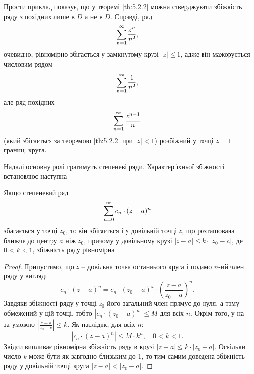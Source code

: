 \begin{remark*}
	Прости приклад показує, що у теоремі \ref{th:5.2.2} можна стверджувати збіжність ряду з похідних лише в $D$ а не в $\bar D$. Справді, ряд 
	\begin{equation*}
		\displaystyle\sum\limits_{n = 1}^\infty \frac{z^n}{n^2},
	\end{equation*}
	очевидно, рівномірно збігається у замкнутому крузі $|z| \le 1$, адже він мажорується числовим рядом
	\begin{equation*}
		\displaystyle\sum\limits_{n = 1}^\infty \frac{1}{n^2},
	\end{equation*}
	але ряд похідних
	\begin{equation*}
		\displaystyle\sum\limits_{n = 1}^\infty \frac{z^{n - 1}}{n}
	\end{equation*}
	(який збігається за теоремою \ref{th:5.2.2} при $|z| < 1$) розбіжний у точці $z = 1$ границі круга.
\end{remark*}

Надалі основну ролі гратимуть степеневі ряди. Характер їхньої збіжності встановлює наступна
\begin{theorem}[Н. Абель, 1826 р.]
	Якщо степеневий ряд 
	\begin{equation}
		\label{eq:5.2._10}
		\displaystyle\sum\limits_{n = 0}^\infty c_n \cdot (z - a)^n
	\end{equation}
	збагається у точці $z_0$, то він збігається і у довільній точці $z$, що розташована ближче до центру $a$ ніж $z_0$, причому у довільному крузі $|z - a| \le k \cdot |z_0 - a|$, де $0 < k < 1$, збіжність ряду рівномірна
\end{theorem}

\begin{proof}
	Припустимо, що $z$ -- довільна точка останнього круга і подамо $n$-ий член ряду у вигляді 
	\begin{equation*}
		c_n \cdot (z - a)^n = c_n \cdot (z_0 - a)^n \cdot \left( \frac{z - a}{z_0 - a} \right)^n.
	\end{equation*}
	Завдяки збіжності ряду у точці $z_0$ його загальний член прямує до нуля, а тому обмежений у цій точці, тобто $|c_n \cdot (z_0 - a)^n|  \le M$  для всіх $n$. Окрім того, у на за умовою $\left| \frac{z - a}{z_0 - a} \right| \le k$. Як наслідок, для всіх $n$:
	\begin{equation}
		\label{eq:5.2.3}
		|c_n \cdot (z - a)^n | \le M \cdot k^n, \quad 0 < k < 1.
	\end{equation}
	Звідси випливає рівномірна збіжність ряду в крузі $|z - a| \le k \cdot |z_0 - a|$. Оскільки число $k$ може бути як завгодно близьким до 1, то тим самим доведена збіжність ряду у довільній точці круга $|z - a| < |z_0 - a|$.
\end{proof}


